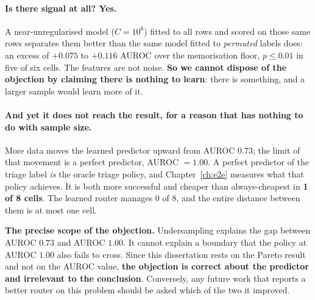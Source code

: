 \paragraph{Is there signal at all? Yes.} A near-unregularised model
($C=10^{6}$) fitted to all rows and scored on those same rows separates them
better than the same model fitted to \emph{permuted} labels does: an excess of
$+0.075$ to $+0.116$ AUROC over the memorisation floor, $p \leq 0.01$ in five of
six cells. The features are not noise. \textbf{So we cannot dispose of the
objection by claiming there is nothing to learn}: there is something, and a larger sample would learn more of it.

\paragraph{And yet it does not reach the result, for a reason that has nothing
to do with sample size.} More data moves the learned predictor upward from
AUROC $0.73$; the limit of that movement is a perfect predictor, AUROC $=1.00$.
A perfect predictor of the triage label \emph{is} the oracle triage policy, and Chapter~\ref{ch:e2e} measures what that policy achieves. It
is both more successful and cheaper than always-cheapest in \textbf{1 of 8
cells}. The learned router manages 0 of 8, and
the entire distance between them is at most one cell.

\begin{scopebox}
\textbf{The precise scope of the objection.} Undersampling explains the gap
between AUROC $0.73$ and AUROC $1.00$. It cannot explain a boundary that the
policy at AUROC $1.00$ also fails to cross. Since this dissertation rests on the Pareto result and not on the AUROC value, \textbf{the objection
is correct about the predictor and irrelevant to the conclusion}. Conversely,
any future work that reports a better router on this problem should be asked
which of the two it improved.
\end{scopebox}

